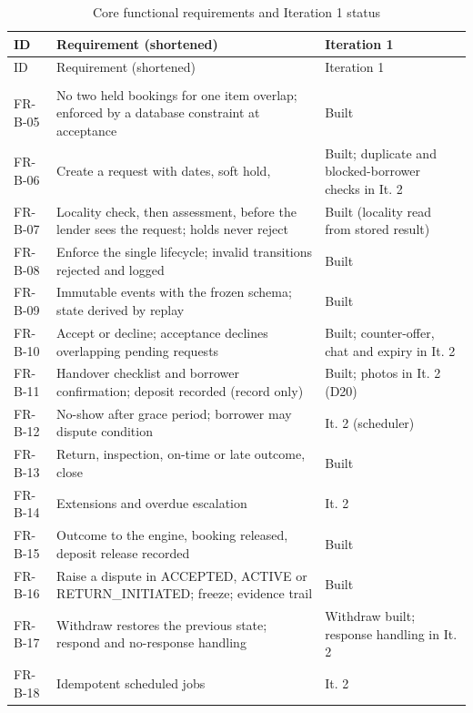 \begingroup\small
\begin{longtable}{@{}L{43pt}L{209pt}L{115pt}@{}}
\caption{Core functional requirements and Iteration 1 status}\label{tab:core-functional-requirements-iteration}\\
\toprule
ID & Requirement (shortened) & Iteration 1 \\
\midrule
\endfirsthead
\toprule
ID & Requirement (shortened) & Iteration 1 \\
\midrule
\endhead
\bottomrule
\endlastfoot
{} \\
FR-B-05 & No two held bookings for one item overlap; enforced by a database constraint at acceptance & Built \\
FR-B-06 & Create a request with dates, soft hold,  & Built; duplicate and blocked-borrower checks in It. 2 \\
FR-B-07 & Locality check, then assessment, before the lender sees the request; holds never reject & Built (locality read from stored result) \\
FR-B-08 & Enforce the single lifecycle; invalid transitions rejected and logged & Built \\
FR-B-09 & Immutable events with the frozen schema; state derived by replay & Built \\
FR-B-10 & Accept or decline; acceptance declines overlapping pending requests & Built; counter-offer, chat and expiry in It. 2 \\
FR-B-11 & Handover checklist and borrower confirmation; deposit recorded (record only) & Built; photos in It. 2 (D20) \\
FR-B-12 & No-show after grace period; borrower may dispute condition & It. 2 (scheduler) \\
FR-B-13 & Return, inspection, on-time or late outcome, close & Built \\
FR-B-14 & Extensions and overdue escalation & It. 2 \\
FR-B-15 & Outcome to the engine, booking released, deposit release recorded & Built \\
FR-B-16 & Raise a dispute in ACCEPTED, ACTIVE or RETURN\_INITIATED; freeze; evidence trail & Built \\
FR-B-17 & Withdraw restores the previous state; respond and no-response handling & Withdraw built; response handling in It. 2 \\
FR-B-18 & Idempotent scheduled jobs & It. 2 \\

\end{longtable}
